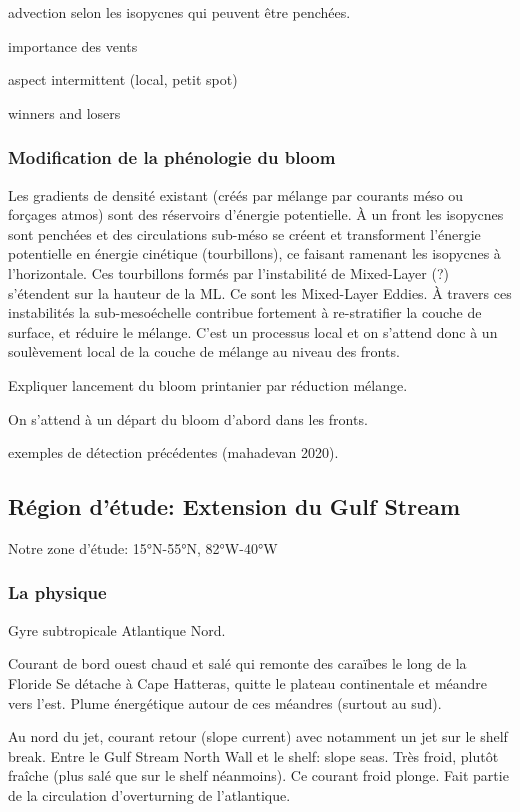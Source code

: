 \documentclass[master]{subfiles}
\begin{document}
advection selon les isopycnes qui peuvent être penchées.

importance des vents

aspect intermittent (local, petit spot)

winners and losers


\subsubsection{Modification de la phénologie du bloom}
\label{sec:modif-phenologie}

Les gradients de densité existant (créés par mélange par courants méso ou forçages atmos) sont des réservoirs d'énergie potentielle. À un front les isopycnes sont penchées et des circulations sub-méso se créent et transforment l'énergie potentielle en énergie cinétique (tourbillons), ce faisant ramenant les isopycnes à l'horizontale.
Ces tourbillons formés par l'instabilité de Mixed-Layer (?) s'étendent sur la hauteur de la ML. Ce sont les Mixed-Layer Eddies.
À travers ces instabilités la sub-mesoéchelle contribue fortement à re-stratifier la couche  de surface, et réduire le mélange.
C'est un processus local et on s'attend donc à un soulèvement local de la couche de mélange au niveau des fronts.


Expliquer lancement du bloom printanier par réduction mélange.

On s'attend à un départ du bloom d'abord dans les fronts.

exemples de détection précédentes (mahadevan 2020).


\subsection{Région d'étude: Extension du Gulf Stream}
\label{sec:region-detude}

Notre zone d'étude: 15°N-55°N, 82°W-40°W

\subsubsection{La physique}
\label{sec:gs-physique}

Gyre subtropicale Atlantique Nord.

Courant de bord ouest chaud et salé qui remonte des caraïbes le long de la Floride
Se détache à Cape Hatteras, quitte le plateau continentale et méandre vers l'est.
Plume énergétique autour de ces méandres (surtout au sud).

Au nord du jet, courant retour (slope current) avec notamment un jet sur le shelf break.
Entre le Gulf Stream North Wall et le shelf: slope seas. Très froid, plutôt fraîche (plus salé que sur le shelf néanmoins).
Ce courant froid plonge. Fait partie de la circulation d'overturning de l'atlantique.
\end{document}
